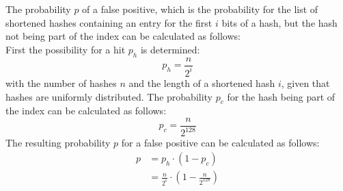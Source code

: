 The probability $p$ of a false positive, which is the probability for the list of shortened hashes containing an entry for the first $i$ bits of a hash, but the hash not being part of the index can be calculated as follows:\\
First the possibility for a hit $p_h$ is determined:
\begin{equation}
	p_h=\frac{n}{2^i}
\end{equation}
with the number of hashes $n$ and the length of a shortened hash $i$, given that hashes are uniformly distributed.
The probability $p_c$ for the hash being part of the index can be calculated as follows:
\begin{equation}
	p_c=\frac{n}{2^{128}}
\end{equation}
The resulting probability $p$ for a false positive can be calculated as follows:
\begin{equation}
	\begin{split}
		p&=p_h\cdot (1-p_c) \\[10pt]
		&= \frac{n}{2^i}\cdot \left(1-\frac{n}{2^{128}}\right)
	\end{split}
\end{equation}

